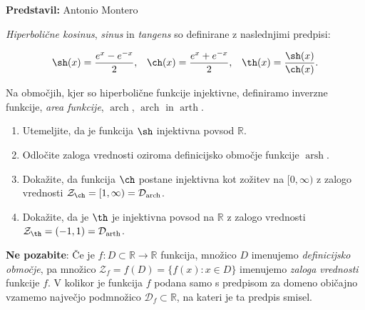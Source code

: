 \textbf{Predstavil:} Antonio Montero

\emph{Hiperbolične kosinus}, \emph{sinus} in \emph{tangens} so definirane z naslednjimi predpisi:


\begin{align*}
\sh(x) = \frac{e^x - e^{-x}}{2}, &&
\ch(x) = \frac{e^x + e^{-x}}{2}, &&
\th(x)=\frac{\sh(x)}{\ch(x)}.
\end{align*}


Na območjih, kjer so hiperbolične funkcije injektivne, definiramo inverzne funkcije, \emph{area funkcije},  $\operatorname{arch}$, $\operatorname{arch}$ in $\operatorname{arth}$. 

\begin{enumerate}
\item Utemeljite, da je funkcija $\sh$ injektivna povsod $\mathbb{R}$. 
\item Odločite zaloga vrednosti oziroma definicijsko območje funkcije $\operatorname{arsh}$.  
\item Dokažite, da funkcija $\ch$ postane injektivna kot zožitev na $[0,\infty)$ z zalogo vrednosti $\mathcal{Z}_{\ch}= [1,\infty) = \mathcal{D}_{\operatorname{arch}}$.
\item Dokažite, da je $\th$ je injektivna povsod na $\mathbb{R}$ z zalogo vrednosti $\mathcal{Z}_{\th}= (-1,1) = \mathcal{D}_{\operatorname{arth}}$. 
\end{enumerate}

\textbf{Ne pozabite}: Če je $f: D \subset \mathbb{R} \to \mathbb{R}$ funkcija, množico $D$ imenujemo \emph{definicijsko območje}, pa množico $\mathcal{Z}_{f}=f(D)= \{f(x): x \in D\}$ imenujemo \emph{zaloga vrednosti} funkcije $f$. V kolikor je funkcija $f$ podana samo s predpisom za domeno običajno vzamemo največjo podmnožico $\mathcal{D}_f \subset \mathbb{R}$, na kateri je ta predpis smisel. 